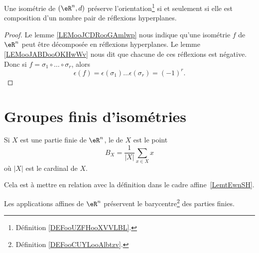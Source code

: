 \begin{theorem}      \label{THOooQEWRooYeOIfZ}
	Une isométrie de \( (\eR^n,d)\) préserve l'orientation\footnote{Définition \ref{DEFooUZFHooXVVLBL}.} si et seulement si elle est composition d'un nombre pair de réflexions hyperplanes.
\end{theorem}

\begin{proof}
	Le lemme \ref{LEMooJCDRooGAmlwp} nous indique qu'une isométrie \( f\) de \( \eR^n\) peut être décomposée en réflexions hyperplanes. Le lemme \ref{LEMooJABDooOKHwWv} nous dit que chacune de ces réflexions est négative. Donc si \( f=\sigma_1\circ\ldots\circ \sigma_r\), alors
	\begin{equation}
		\epsilon(f)=\epsilon(\sigma_1)\ldots \epsilon(\sigma_r)=(-1)^r.
	\end{equation}
\end{proof}


\section{Groupes finis d'isométries}

\begin{definition}      \label{DEFooCUYLooAlbtzv}
	Si \( X\) est une partie finie de \( \eR^n\), le  de \( X\) est le point
	\begin{equation}
		B_X=\frac{1}{ | X | }\sum_{x\in X}x
	\end{equation}
	où \( | X |\) est le cardinal de \( X\).
\end{definition}
Cela est à mettre en relation avec la définition dans le cadre affine~\ref{LemtEwnSH}.

\begin{lemma}        \label{LEMooSEZYooYceLIb}
	Les applications affines de \( \eR^n\) préservent le barycentre\footnote{Définition \ref{DEFooCUYLooAlbtzv}.} des parties finies.
\end{lemma}

